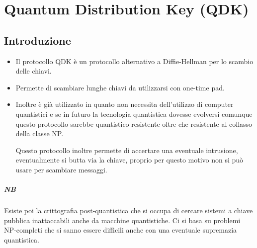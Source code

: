 \chapter{Quantum Distribution Key (QDK)}
\section{Introduzione}
\begin{itemize}
	\item Il protocollo QDK è un protocollo alternativo a Diffie-Hellman per lo scambio delle chiavi.
	\item Permette di scambiare lunghe chiavi da utilizzarsi con one-time pad.
	\item Inoltre è già utilizzato in quanto non necessita dell'utilizzo di computer quantistici e se in futuro la tecnologia quantistica dovesse evolversi comunque questo protocollo sarebbe quantistico-resistente oltre che resistente al collasso della classe NP.
	
	Questo protocollo inoltre permette di accertare una eventuale intrusione, eventualmente si butta via la chiave, proprio per questo motivo non si può usare per scambiare messaggi.
\end{itemize}
\paragraph{NB} Esiste poi la crittografia post-quantistica che si occupa di cercare sistemi a chiave pubblica inattaccabili anche da macchine quantistiche. Ci si basa su problemi NP-completi che si sanno essere difficili anche con una eventuale supremazia quantistica.

